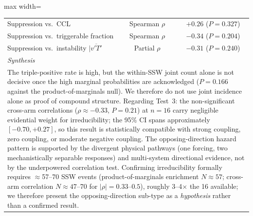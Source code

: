 \documentclass[11pt,letterpaper]{article}
\begin{document}
\begin{table}[htbp]
\begin{adjustbox}{max width=\textwidth}
\begin{tabular}{lcc}
Suppression vs.\ CCL & Spearman $\rho$ & $+0.26$ ($P = 0.327$) \\
Suppression vs.\ triggerable fraction & Spearman $\rho$ & $-0.34$ ($P = 0.204$) \\
Suppression vs.\ instability $| \overline{v'T'}$ & Partial $\rho$ & $-0.31$ ($P = 0.240$) \\
\midrule
\multicolumn{3}{l}{\emph{Synthesis}} \\
\midrule
\multicolumn{3}{p{13cm}}{The triple-positive rate is high, but the within-SSW joint count alone is not decisive once the high marginal probabilities are acknowledged ($P = 0.166$ against the product-of-marginals null). We therefore do not use joint incidence alone as proof of compound structure. Regarding Test~3: the non-significant cross-arm correlations ($\rho \approx -0.33$, $P = 0.21$) at $n = 16$ carry negligible evidential weight for irreducibility; the 95\% CI spans approximately $[-0.70, +0.27]$, so this result is statistically compatible with strong coupling, zero coupling, or moderate negative coupling. The opposing-direction hazard pattern is supported by the divergent physical pathways (one forcing, two mechanistically separable responses) and multi-system directional evidence, not by the underpowered correlation test. Confirming irreducibility formally requires $\approx$57--70 SSW events (product-of-marginals enrichment $N \approx 57$; cross-arm correlation $N \approx 47$--70 for $|\rho| = 0.33$--$0.5$), roughly 3--4$\times$ the 16 available; we therefore present the opposing-direction sub-type as a \emph{hypothesis} rather than a confirmed result.} \\
\bottomrule
\end{tabular}
\end{adjustbox}
\end{table}
\end{document}
